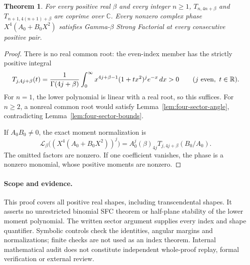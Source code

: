 \documentclass[11pt]{article}
\newtheorem{theorem}{Theorem}
\begin{document}
\begin{theorem}\label{thm:gamma-lower-four-quadratic}
For every positive real $\beta$ and every integer $n\ge1$,
$T_{n,4n+\beta}$ and $T_{n+1,4(n+1)+\beta}$ are coprime over
$\mathbb C$.  Every nonzero complex phase $X^4(A_0+B_0X^2)$
satisfies Gamma-$\beta$ Strong Factorial at every consecutive
positive pair.
\end{theorem}
\begin{proof}
There is no real common root: the even-index member has the
strictly positive integral
\[
 T_{j,4j+\beta}(t)=\frac1{\Gamma(4j+\beta)}
    \int_0^\infty x^{4j+\beta-1}(1+tx^2)^j e^{-x}\,dx
       >0\qquad(j\ {\rm even},\ t\in\mathbb R).
\]
For $n=1$, the lower polynomial is linear with a real root,
so this suffices.  For $n\ge2$, a nonreal common root would satisfy
Lemma~\ref{lem:four-sector-angle}, contradicting
Lemma~\ref{lem:four-sector-bounds}.

If $A_0B_0\ne0$, the exact moment normalization is
\[
 \mathcal L_\beta\bigl((X^4(A_0+B_0X^2))^j\bigr)
 = A_0^j(\beta)_{4j}T_{j,4j+\beta}(B_0/A_0).
\]
The omitted factors are nonzero.  If one coefficient vanishes,
the phase is a nonzero monomial, whose positive moments are nonzero.
\end{proof}

\paragraph{Scope and evidence.}
This proof covers all positive real shapes, including
transcendental shapes.  It asserts no unrestricted binomial SFC
theorem or half-plane stability of the lower moment polynomial.
The written sector argument supplies every index and shape
quantifier.  Symbolic controls check the identities, angular margins
and normalizations; finite checks are not used as an index theorem.
Internal mathematical audit does not constitute independent
whole-proof replay, formal verification or external review.
\end{document}
